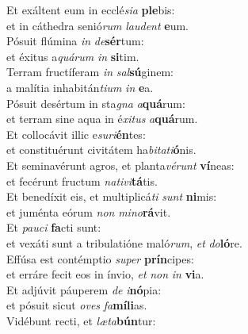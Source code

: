 \evenverse Et exáltent eum in ecclé\textit{si}\textit{a} \textbf{ple}bis:~\*\\
\evenverse et in cáthedra senió\textit{rum} \textit{lau}\textit{dent} \textbf{e}um.\\
\oddverse Pósuit flúmina \textit{in} \textit{de}\textbf{sér}tum:~\*\\
\oddverse et éxitus a\textit{quá}\textit{rum} \textit{in} \textbf{si}tim.\\
\evenverse Terram fructíferam \textit{in} \textit{sal}\textbf{sú}ginem:~\*\\
\evenverse a malítia inhabitán\textit{ti}\textit{um} \textit{in} \textbf{e}a.\\
\oddverse Pósuit desértum in sta\textit{gna} \textit{a}\textbf{quá}rum:~\*\\
\oddverse et terram sine aqua in é\textit{xi}\textit{tus} \textit{a}\textbf{quá}rum.\\
\evenverse Et collocávit illic e\textit{su}\textit{ri}\textbf{én}tes:~\*\\
\evenverse et constituérunt civitátem ha\textit{bi}\textit{ta}\textit{ti}\textbf{ó}nis.\\
\oddverse Et seminavérunt agros, et planta\textit{vé}\textit{runt} \textbf{ví}neas:~\*\\
\oddverse et fecérunt fructum \textit{na}\textit{ti}\textit{vi}\textbf{tá}tis.\\
\evenverse Et benedíxit eis, et multiplicá\textit{ti} \textit{sunt} \textbf{ni}mis:~\*\\
\evenverse et juménta eórum \textit{non} \textit{mi}\textit{no}\textbf{rá}vit.\\
\oddverse Et \textit{pau}\textit{ci} \textbf{fa}cti sunt:~\*\\
\oddverse et vexáti sunt a tribulatióne maló\textit{rum}, \textit{et} \textit{do}\textbf{ló}re.\\
\evenverse Effúsa est contémptio \textit{su}\textit{per} \textbf{prín}cipes:~\*\\
\evenverse et erráre fecit eos in ínvio, \textit{et} \textit{non} \textit{in} \textbf{vi}a.\\
\oddverse Et adjúvit páuperem \textit{de} \textit{i}\textbf{nó}pia:~\*\\
\oddverse et pósuit sicut \textit{o}\textit{ves} \textit{fa}\textbf{mí}\textbf{li}as.\\
\evenverse Vidébunt recti, et \textit{læ}\textit{ta}\textbf{bún}tur:~\*\\
